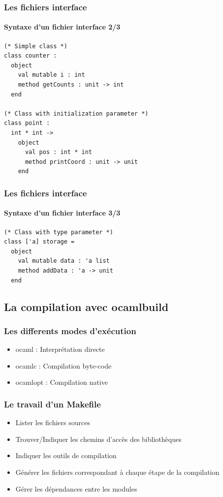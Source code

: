 \begin{frame}[fragile]
	\frametitle{Les fichiers interface}
	\framesubtitle{Syntaxe d'un fichier interface 2/3}
	\lstset{basicstyle=\small}
	\begin{lstlisting}
(* Simple class *)
class counter :
  object
    val mutable i : int
    method getCounts : unit -> int
  end

(* Class with initialization parameter *)
class point :
  int * int -> 
    object
      val pos : int * int
      method printCoord : unit -> unit
    end
	\end{lstlisting}
\end{frame}

\begin{frame}[fragile]
	\frametitle{Les fichiers interface}
	\framesubtitle{Syntaxe d'un fichier interface 3/3}
	\lstset{basicstyle=\small}
	\begin{lstlisting}
(* Class with type parameter *)
class ['a] storage = 
  object 
    val mutable data : 'a list
    method addData : 'a -> unit 
  end
	\end{lstlisting}
\end{frame}

\subsection{La compilation avec ocamlbuild} %
\begin{frame}[fragile]
	\frametitle{Les differents modes d'exécution}
	\huge
	\begin{itemize}
		\item ocaml : Interprétation directe 
		\item ocamlc : Compilation byte-code
		\item ocamlopt : Compilation native
	\end{itemize}
	\normalsize
\end{frame}

\begin{frame}
	\frametitle{Le travail d'un Makefile}
	\begin{center}
		\begin{itemize}
			\item Lister les fichiers sources
			\item Trouver/Indiquer les chemins d'accès des bibliothèques
			\item Indiquer les outils de compilation
			\item Générer les fichiers correspondant à chaque étape de la compilation
			\item Gérer les dépendances entre les modules
		\end{itemize}
	\end{center}
\end{frame}

